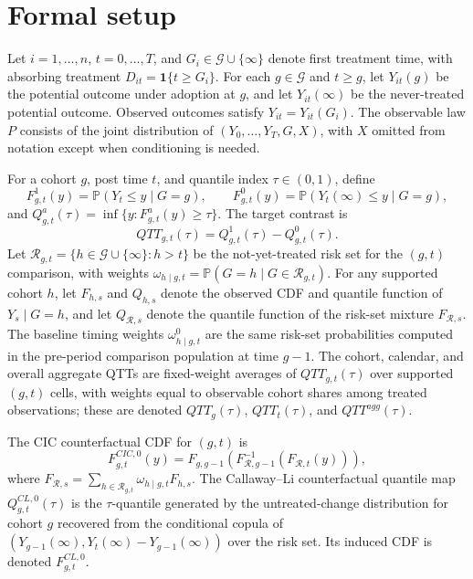 \documentclass[11pt]{article}
\renewcommand{\Pr}{\mathbb{P}}
\newcommand{\one}{\mathbf{1}}
\theoremstyle{definition}
\theoremstyle{plain}
\theoremstyle{remark}
\begin{document}
\section{Formal setup}
Let \(i=1,\ldots,n\), \(t=0,\ldots,T\), and \(G_i\in\mathcal G\cup\{\infty\}\) denote first treatment time, with absorbing treatment \(D_{it}=\one\{t\geq G_i\}\). For each \(g\in\mathcal G\) and \(t\geq g\), let \(Y_{it}(g)\) be the potential outcome under adoption at \(g\), and let \(Y_{it}(\infty)\) be the never-treated potential outcome. Observed outcomes satisfy \(Y_{it}=Y_{it}(G_i)\). The observable law \(P\) consists of the joint distribution of \((Y_0,\ldots,Y_T,G,X)\), with \(X\) omitted from notation except when conditioning is needed.

For a cohort \(g\), post time \(t\), and quantile index \(\tau\in(0,1)\), define
\[
F^1_{g,t}(y)=\Pr(Y_t\leq y\mid G=g),\qquad
F^0_{g,t}(y)=\Pr(Y_t(\infty)\leq y\mid G=g),
\]
and \(Q^a_{g,t}(\tau)=\inf\{y:F^a_{g,t}(y)\geq\tau\}\). The target contrast is
\[
QTT_{g,t}(\tau)=Q^1_{g,t}(\tau)-Q^0_{g,t}(\tau).
\]
Let \(\mathcal R_{g,t}=\{h\in\mathcal G\cup\{\infty\}:h>t\}\) be the not-yet-treated risk set for the \((g,t)\) comparison, with weights \(\omega_{h\mid g,t}=\Pr(G=h\mid G\in\mathcal R_{g,t})\).
For any supported cohort \(h\), let \(F_{h,s}\) and \(Q_{h,s}\) denote the observed CDF and quantile function of \(Y_s\mid G=h\), and let \(Q_{\mathcal R,s}\) denote the quantile function of the risk-set mixture \(F_{\mathcal R,s}\). The baseline timing weights \(\omega^0_{h\mid g,t}\) are the same risk-set probabilities computed in the pre-period comparison population at time \(g-1\). The cohort, calendar, and overall aggregate QTTs are fixed-weight averages of \(QTT_{g,t}(\tau)\) over supported \((g,t)\) cells, with weights equal to observable cohort shares among treated observations; these are denoted \(QTT_g(\tau)\), \(QTT_t(\tau)\), and \(QTT^{agg}(\tau)\).

The CIC counterfactual CDF for \((g,t)\) is
\[
F^{CIC,0}_{g,t}(y)
  = F_{g,g-1}\!\left(F^{-1}_{\mathcal R,g-1}\!\left(F_{\mathcal R,t}(y)\right)\right),
\]
where \(F_{\mathcal R,s}=\sum_{h\in\mathcal R_{g,t}}\omega_{h\mid g,t}F_{h,s}\). The Callaway--Li counterfactual quantile map \(Q^{CL,0}_{g,t}(\tau)\) is the \(\tau\)-quantile generated by the untreated-change distribution for cohort \(g\) recovered from the conditional copula of \((Y_{g-1}(\infty),Y_t(\infty)-Y_{g-1}(\infty))\) over the risk set. Its induced CDF is denoted \(F^{CL,0}_{g,t}\).
\end{document}
